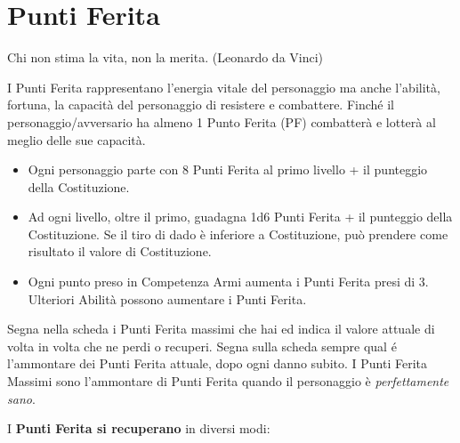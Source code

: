 \section{Punti Ferita}\label{puntiferita}

\begin{enfasi}{Chi non stima la vita, non la merita. (Leonardo da Vinci)}\end{enfasi}

\medskip

I Punti Ferita rappresentano l'energia vitale del personaggio ma anche l'abilità, fortuna, la capacità del personaggio di resistere e combattere. Finché il personaggio/avversario ha almeno 1 Punto Ferita (PF) combatterà e lotterà al meglio delle sue capacità.

\begin{itemize}[leftmargin=*] \setlength{\itemsep}{0pt}
\item Ogni personaggio parte con 8 Punti Ferita al primo livello + il punteggio della Costituzione.

\item Ad ogni livello, oltre il primo, guadagna 1d6 Punti Ferita + il punteggio della Costituzione. Se il tiro di dado è inferiore a Costituzione, può prendere come risultato il valore di Costituzione.

\item Ogni punto preso in Competenza Armi aumenta i Punti Ferita presi di 3. Ulteriori Abilità possono aumentare i Punti Ferita.
\end{itemize}

Segna nella scheda i Punti Ferita massimi che hai ed indica il valore attuale di volta in volta che ne perdi o recuperi. Segna sulla scheda sempre qual é l'ammontare dei Punti Ferita attuale, dopo ogni danno subito. I Punti Ferita Massimi sono l'ammontare di Punti Ferita quando il personaggio è \emph{perfettamente sano}.


\medskip

I \textbf{Punti Ferita si recuperano} in diversi modi:\label{recuperarepf}

